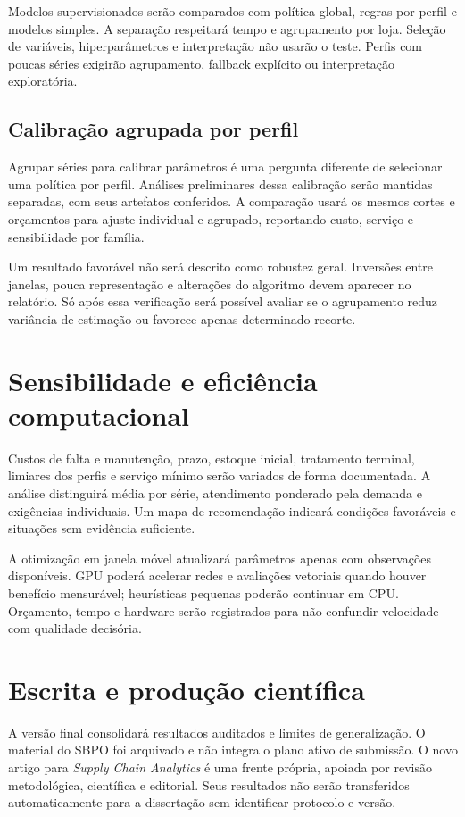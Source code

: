 Modelos supervisionados serão comparados com política global, regras por perfil e modelos simples. A separação respeitará tempo e agrupamento por loja. Seleção de variáveis, hiperparâmetros e interpretação não usarão o teste. Perfis com poucas séries exigirão agrupamento, fallback explícito ou interpretação exploratória.

\subsection{Calibração agrupada por perfil}
\label{sec:robustez_pooling}

Agrupar séries para calibrar parâmetros é uma pergunta diferente de selecionar uma política por perfil. Análises preliminares dessa calibração serão mantidas separadas, com seus artefatos conferidos. A comparação usará os mesmos cortes e orçamentos para ajuste individual e agrupado, reportando custo, serviço e sensibilidade por família.

Um resultado favorável não será descrito como robustez geral. Inversões entre janelas, pouca representação e alterações do algoritmo devem aparecer no relatório. Só após essa verificação será possível avaliar se o agrupamento reduz variância de estimação ou favorece apenas determinado recorte.

\section{Sensibilidade e eficiência computacional}

Custos de falta e manutenção, prazo, estoque inicial, tratamento terminal, limiares dos perfis e serviço mínimo serão variados de forma documentada. A análise distinguirá média por série, atendimento ponderado pela demanda e exigências individuais. Um mapa de recomendação indicará condições favoráveis e situações sem evidência suficiente.

A otimização em janela móvel atualizará parâmetros apenas com observações disponíveis. GPU poderá acelerar redes e avaliações vetoriais quando houver benefício mensurável; heurísticas pequenas poderão continuar em CPU. Orçamento, tempo e hardware serão registrados para não confundir velocidade com qualidade decisória.

\section{Escrita e produção científica}

A versão final consolidará resultados auditados e limites de generalização. O material do SBPO foi arquivado e não integra o plano ativo de submissão. O novo artigo para \textit{Supply Chain Analytics} é uma frente própria, apoiada por revisão metodológica, científica e editorial. Seus resultados não serão transferidos automaticamente para a dissertação sem identificar protocolo e versão.

